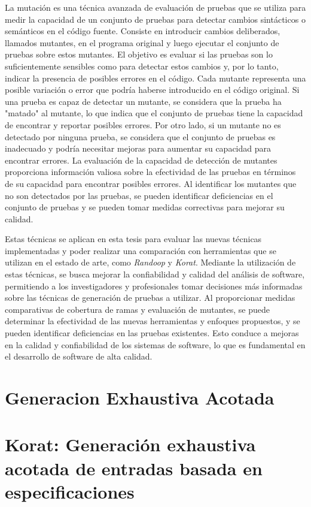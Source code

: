 La mutación es una técnica avanzada de evaluación de pruebas que se utiliza para medir la capacidad de un conjunto de pruebas para detectar cambios sintácticos o semánticos en el código fuente. Consiste en introducir cambios deliberados, llamados mutantes, en el programa original y luego ejecutar el conjunto de pruebas sobre estos mutantes. El objetivo es evaluar si las pruebas son lo suficientemente sensibles como para detectar estos cambios y, por lo tanto, indicar la presencia de posibles errores en el código.
Cada mutante representa una posible variación o error que podría haberse introducido en el código original. Si una prueba es capaz de detectar un mutante, se considera que la prueba ha "matado" al mutante, lo que indica que el conjunto de pruebas tiene la capacidad de encontrar y reportar posibles errores. Por otro lado, si un mutante no es detectado por ninguna prueba, se considera que el conjunto de pruebas es inadecuado y podría necesitar mejoras para aumentar su capacidad para encontrar errores.
La evaluación de la capacidad de detección de mutantes proporciona información valiosa sobre la efectividad de las pruebas en términos de su capacidad para encontrar posibles errores. Al identificar los mutantes que no son detectados por las pruebas, se pueden identificar deficiencias en el conjunto de pruebas y se pueden tomar medidas correctivas para mejorar su calidad.

Estas técnicas se aplican en esta tesis para evaluar las nuevas técnicas implementadas y poder realizar una comparación con herramientas que se utilizan en el estado de arte, como \emph{Randoop} y \emph{Korat}. Mediante la utilización de estas técnicas, se busca mejorar la confiabilidad y calidad del análisis de software, permitiendo a los investigadores y profesionales tomar decisiones más informadas sobre las técnicas de generación de pruebas a utilizar. Al proporcionar medidas comparativas de cobertura de ramas y evaluación de mutantes, se puede determinar la efectividad de las nuevas herramientas y enfoques propuestos, y se pueden identificar deficiencias en las pruebas existentes. Esto conduce a mejoras en la calidad y confiabilidad de los sistemas de software, lo que es fundamental en el desarrollo de software de alta calidad.

\section{Generacion Exhaustiva Acotada}
\label{sec:be}

\section{Korat: Generación exhaustiva acotada de entradas basada en especificaciones}
\label{sec:korat}

